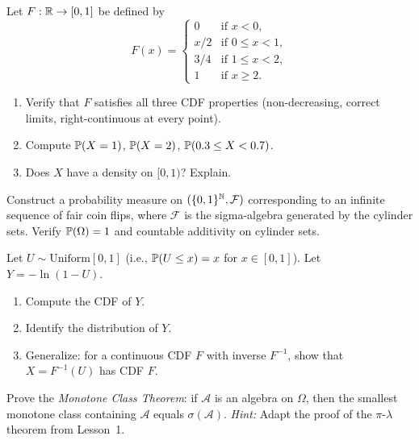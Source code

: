 \documentclass[11pt,a4paper]{article}
\begin{document}
\begin{exercise}
\label{ex:cdf_construct}
Let $F: \mathbb{R} \to [0,1]$ be defined by
\[
  F(x) = \begin{cases}
    0 & \text{if } x < 0, \\
    x/2 & \text{if } 0 \leq x < 1, \\
    3/4 & \text{if } 1 \leq x < 2, \\
    1 & \text{if } x \geq 2.
  \end{cases}
\]
\begin{enumerate}[nosep,label=(\alph*)]
  \item Verify that $F$ satisfies all three CDF properties
    (non-decreasing, correct limits, right-continuous at every point).
  \item Compute $\mathbb{P}(X = 1)$, $\mathbb{P}(X = 2)$, $\mathbb{P}(0.3 \leq X < 0.7)$.
  \item Does $X$ have a density on $[0, 1)$? Explain.
\end{enumerate}
\end{exercise}

\begin{exercise}
\label{ex:coin_flip}
Construct a probability measure on $(\{0,1\}^{\mathbb{N}}, \mathcal{F})$
corresponding to an infinite sequence of fair coin flips, where
$\mathcal{F}$ is the sigma-algebra generated by the cylinder sets.
Verify $\mathbb{P}(\Omega) = 1$ and countable additivity on cylinder sets.
\end{exercise}

\begin{exercise}
\label{ex:pushforward_uniform}
Let $U \sim \text{Uniform}[0,1]$ (i.e., $\mathbb{P}(U \leq x) = x$ for
$x \in [0,1]$). Let $Y = -\ln(1 - U)$.
\begin{enumerate}[nosep,label=(\alph*)]
  \item Compute the CDF of $Y$.
  \item Identify the distribution of $Y$.
  \item Generalize: for a continuous CDF $F$ with inverse $F^{-1}$, show
    that $X = F^{-1}(U)$ has CDF $F$.
\end{enumerate}
\end{exercise}

\begin{exercise}
\label{ex:monotone_class}
Prove the \emph{Monotone Class Theorem}: if $\mathcal{A}$ is an algebra
on $\Omega$, then the smallest monotone class containing $\mathcal{A}$
equals $\sigma(\mathcal{A})$.
\textit{Hint:} Adapt the proof of the $\pi$-$\lambda$ theorem from
Lesson~1.
\end{exercise}
\end{document}
